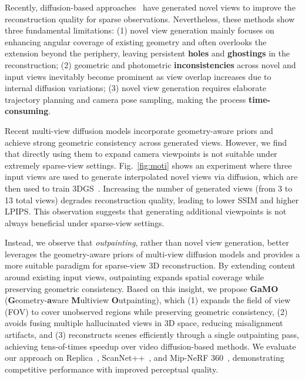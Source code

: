 \documentclass[runningheads]{llncs}
\begin{document}
Recently, diffusion-based approaches~\cite{zhong2025taming,wu2025genfusion,wu2024reconfusion,wu2025difix3d+,anciukevicius2023renderdiffusion} have generated novel views to improve the reconstruction quality for sparse observations. Nevertheless, these methods show three fundamental limitations: (1) novel view generation mainly focuses on enhancing angular coverage of existing geometry and often overlooks the extension beyond the periphery, leaving persistent \textbf{holes} and \textbf{ghostings} in the reconstruction; (2) geometric and photometric \textbf{inconsistencies} across novel and input views inevitably become prominent as view overlap increases due to internal diffusion variations; (3) novel view generation requires elaborate trajectory planning and camera pose sampling, making the process \textbf{time-consuming}.

Recent multi-view diffusion models incorporate geometry-aware priors and achieve strong geometric consistency across generated views. However, we find that directly using them to expand camera viewpoints is not suitable under extremely sparse-view settings. Fig.~\ref{fig:moti} shows an experiment where three input views are used to generate interpolated novel views via diffusion, which are then used to train 3DGS~\cite{kerbl20233d}. Increasing the number of generated views (from 3 to 13 total views) degrades reconstruction quality, leading to lower SSIM and higher LPIPS. This observation suggests that generating additional viewpoints is not always beneficial under sparse-view settings. 

Instead, we observe that \textit{outpainting}, rather than novel view generation, better leverages the geometry-aware priors of multi-view diffusion models and provides a more suitable paradigm for sparse-view 3D reconstruction. By extending content around existing input views, outpainting expands spatial coverage while preserving geometric consistency. Based on this insight, we propose \textbf{GaMO} (\textbf{G}eometry-\textbf{a}ware \textbf{M}ultiview \textbf{O}utpainting), which (1) expands the field of view (FOV) to cover unobserved regions while preserving geometric consistency, (2) avoids fusing multiple hallucinated views in 3D space, reducing misalignment artifacts, and (3) reconstructs scenes efficiently through a single outpainting pass, achieving tens-of-times speedup over video diffusion-based methods. We evaluate our approach on Replica~\cite{straub2019replica}, ScanNet++~\cite{yeshwanth2023scannet++}, and Mip-NeRF 360~\cite{barron2023mipnerf360}, demonstrating competitive performance with improved perceptual quality.
\end{document}
